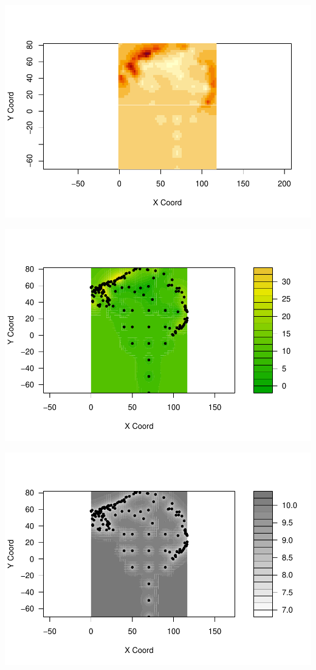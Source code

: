 \documentclass[
]{article}
\begin{document}
\includegraphics{Assignment_1_files/figure-latex/unnamed-chunk-55-1.pdf}

\includegraphics{Assignment_1_files/figure-latex/unnamed-chunk-56-1.pdf}

\includegraphics{Assignment_1_files/figure-latex/unnamed-chunk-57-1.pdf}
\end{document}
